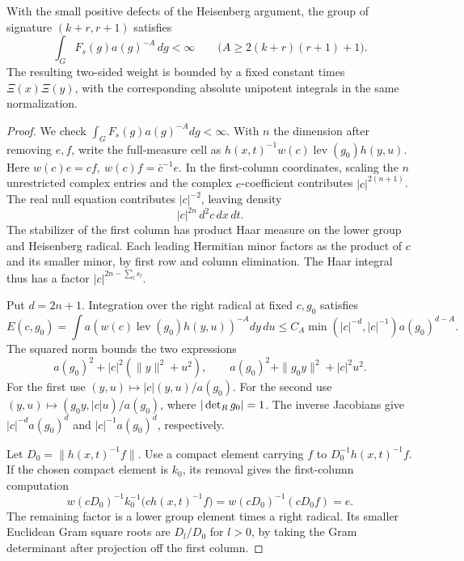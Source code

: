 \begin{proposition}\label{prop:xi-group-majorant}
With the small positive defects of the Heisenberg argument,
the group of signature \((k+r,r+1)\) satisfies 
\[
 \int_G F_s(g)a(g)^{-A}\,dg<\infty\qquad\bigl(A\ge2(k+r)(r+1)+1\bigr).
\]
 The resulting
two-sided weight is bounded by a fixed constant times
\(\Xi(x)\Xi(y)\), with the corresponding absolute unipotent
integrals in the same normalization.
\end{proposition}

\begin{proof}

We check \(\int_G F_s(g)a(g)^{-A}dg<\infty\).
With \(n\) the dimension after removing \(e,f\), write
the full-measure cell as
\(h(x,t)^{-1}w(c)\operatorname{lev}(g_0)h(y,u)\).
Here \(w(c)e=cf,\ w(c)f=\bar c^{-1}e\).
In the first-column coordinates, scaling the \(n\) unrestricted
complex entries and the complex \(e\)-coefficient contributes
\(|c|^{2(n+1)}\). The real null equation contributes
\(|c|^{-2}\), leaving density
\[
   |c|^{2n}\,d^2c\,dx\,dt .
\] The stabilizer of
the first column has product Haar measure on the lower
group and Heisenberg radical. Each leading Hermitian
minor factors as the product of \(c\) and its smaller
minor, by first row and column elimination. The Haar
integral thus has a factor \(|c|^{2n-\sum_l s_l}\).


Put \(d=2n+1\). Integration over the right radical at
fixed \(c,g_0\) satisfies
\[
 E(c,g_0)=\int a(w(c)\operatorname{lev}(g_0)h(y,u))^{-A}dy\,du
 \le C_A\min(|c|^{-d},|c|^{-1})a(g_0)^{d-A}.
\]
The squared norm bounds the two expressions
\[
   a(g_0)^2+|c|^2(\|y\|^2+u^2),\qquad
   a(g_0)^2+\|g_0y\|^2+|c|^2u^2.
\]
For the first use \((y,u)\mapsto |c|(y,u)/a(g_0)\).
For the second use \((y,u)\mapsto(g_0y,|c|u)/a(g_0)\), where
\(|\det_{R}g_0|=1\). The inverse Jacobians give
\(|c|^{-d}a(g_0)^d\) and \(|c|^{-1}a(g_0)^d\), respectively.


Let \(D_0=\|h(x,t)^{-1}f\|\). Use a compact element
carrying \(f\) to \(D_0^{-1}h(x,t)^{-1}f\).
If the chosen compact element is \(k_0\), its removal gives
the first-column computation
\[
    w(cD_0)^{-1}k_0^{-1}\bigl(c h(x,t)^{-1}f\bigr)
                    =w(cD_0)^{-1}(cD_0f)=e .
\]
The remaining factor is a lower group element times
a right radical. Its smaller Euclidean Gram square
roots are \(D_l/D_0\) for \(l>0\), by taking the
Gram determinant after projection off the first
column.


\end{proof}
